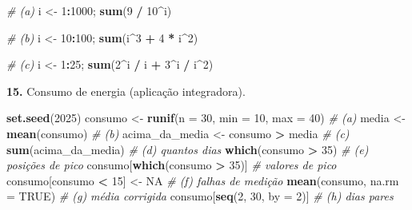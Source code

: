 \documentclass[
  portuguese,
  11pt,
  openany]{book}
\newenvironment{Shaded}{\begin{snugshade}}{\end{snugshade}}
\newcommand{\AttributeTok}[1]{\textcolor[rgb]{0.13,0.29,0.53}{#1}}
\newcommand{\CommentTok}[1]{\textcolor[rgb]{0.56,0.35,0.01}{\textit{#1}}}
\newcommand{\ConstantTok}[1]{\textcolor[rgb]{0.56,0.35,0.01}{#1}}
\newcommand{\DecValTok}[1]{\textcolor[rgb]{0.00,0.00,0.81}{#1}}
\newcommand{\FunctionTok}[1]{\textcolor[rgb]{0.13,0.29,0.53}{\textbf{#1}}}
\newcommand{\NormalTok}[1]{#1}
\newcommand{\OtherTok}[1]{\textcolor[rgb]{0.56,0.35,0.01}{#1}}
\newcommand{\SpecialCharTok}[1]{\textcolor[rgb]{0.81,0.36,0.00}{\textbf{#1}}}
\begin{document}
\begin{Shaded}
\begin{Highlighting}[]
\CommentTok{\# (a)}
\NormalTok{i }\OtherTok{\textless{}{-}} \DecValTok{1}\SpecialCharTok{:}\DecValTok{1000}\NormalTok{; }\FunctionTok{sum}\NormalTok{(}\DecValTok{9} \SpecialCharTok{/} \DecValTok{10}\SpecialCharTok{\^{}}\NormalTok{i)}

\CommentTok{\# (b)}
\NormalTok{i }\OtherTok{\textless{}{-}} \DecValTok{10}\SpecialCharTok{:}\DecValTok{100}\NormalTok{; }\FunctionTok{sum}\NormalTok{(i}\SpecialCharTok{\^{}}\DecValTok{3} \SpecialCharTok{+} \DecValTok{4} \SpecialCharTok{*}\NormalTok{ i}\SpecialCharTok{\^{}}\DecValTok{2}\NormalTok{)}

\CommentTok{\# (c)}
\NormalTok{i }\OtherTok{\textless{}{-}} \DecValTok{1}\SpecialCharTok{:}\DecValTok{25}\NormalTok{; }\FunctionTok{sum}\NormalTok{(}\DecValTok{2}\SpecialCharTok{\^{}}\NormalTok{i }\SpecialCharTok{/}\NormalTok{ i }\SpecialCharTok{+} \DecValTok{3}\SpecialCharTok{\^{}}\NormalTok{i }\SpecialCharTok{/}\NormalTok{ i}\SpecialCharTok{\^{}}\DecValTok{2}\NormalTok{)}
\end{Highlighting}
\end{Shaded}

\textbf{15.} Consumo de energia (aplicação integradora).

\begin{Shaded}
\begin{Highlighting}[]
\FunctionTok{set.seed}\NormalTok{(}\DecValTok{2025}\NormalTok{)}
\NormalTok{consumo }\OtherTok{\textless{}{-}} \FunctionTok{runif}\NormalTok{(}\AttributeTok{n =} \DecValTok{30}\NormalTok{, }\AttributeTok{min =} \DecValTok{10}\NormalTok{, }\AttributeTok{max =} \DecValTok{40}\NormalTok{)   }\CommentTok{\# (a)}
\NormalTok{media   }\OtherTok{\textless{}{-}} \FunctionTok{mean}\NormalTok{(consumo)                       }\CommentTok{\# (b)}
\NormalTok{acima\_da\_media }\OtherTok{\textless{}{-}}\NormalTok{ consumo }\SpecialCharTok{\textgreater{}}\NormalTok{ media              }\CommentTok{\# (c)}
\FunctionTok{sum}\NormalTok{(acima\_da\_media)                            }\CommentTok{\# (d) quantos dias}
\FunctionTok{which}\NormalTok{(consumo }\SpecialCharTok{\textgreater{}} \DecValTok{35}\NormalTok{)                            }\CommentTok{\# (e) posições de pico}
\NormalTok{consumo[}\FunctionTok{which}\NormalTok{(consumo }\SpecialCharTok{\textgreater{}} \DecValTok{35}\NormalTok{)]                   }\CommentTok{\#     valores de pico}
\NormalTok{consumo[consumo }\SpecialCharTok{\textless{}} \DecValTok{15}\NormalTok{] }\OtherTok{\textless{}{-}} \ConstantTok{NA}                    \CommentTok{\# (f) falhas de medição}
\FunctionTok{mean}\NormalTok{(consumo, }\AttributeTok{na.rm =} \ConstantTok{TRUE}\NormalTok{)                    }\CommentTok{\# (g) média corrigida}
\NormalTok{consumo[}\FunctionTok{seq}\NormalTok{(}\DecValTok{2}\NormalTok{, }\DecValTok{30}\NormalTok{, }\AttributeTok{by =} \DecValTok{2}\NormalTok{)]                    }\CommentTok{\# (h) dias pares}
\end{Highlighting}
\end{Shaded}
\end{document}
